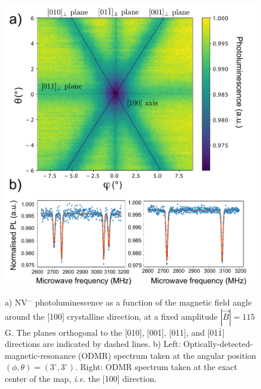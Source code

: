 \documentclass[9pt,twocolumn,twoside]{revtex4-1}
\begin{document}
\begin{figure}[ht]
\centering
{\includegraphics[width=\linewidth]{Carte_annotation}}
\caption{a) NV$^-$ photoluminescence as a function of the magnetic field angle around the [100] crystalline direction, at a fixed amplitude $|\vec{B}|=115$G. The planes orthogonal to the [010], [001], [011], and [01$\bar 1$] directions are indicated by dashed lines. b) Left: Optically-detected-magnetic-resonance (ODMR) spectrum taken at the angular position $(\phi, \theta)=(3^\circ,3^\circ)$. Right: ODMR spectrum taken at the exact center of the map, {\it i.e.} the [100] direction.}
\label{map}
\end{figure}
\end{document}
